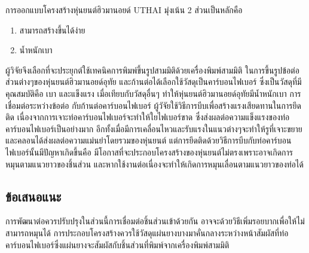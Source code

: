 การออกแบบโครงสร้างหุ่นยนต์ฮิวมานอยด์ UTHAI มุ่งเน้น 2 ส่วนเป็นหลักคือ
\vspace{-3mm}
\begin{enumerate}[label=\arabic*, leftmargin=1.5cm]
	\setlength\itemsep{-0.25em}
	\item สามารถสร้างขึ้นได้ง่าย
	\item น้ำหนักเบา
\end{enumerate}

ผู้วิจัยจึงเลือกที่จะประยุกต์ใช้เทคนิคการพิมพ์ขึ้นรูปสามมิติด้วยเครื่องพิมพ์สามมิติ ในการขึ้นรูปข้อต่อส่วนต่างๆของหุ่นยนต์ฮิวมานอยด์อุทัย
และก้านต่อได้เลือกใช้วัสดุเป็นคาร์บอนไฟเบอร์ ซึ่งเป็นวัสดุที่มีคุณสมบัติคือ เบา และแข็งแรง เมื่อเทียบกับวัสดุอื่นๆ ทำให้หุ่นยนต์ฮิวมานอยด์อุทัยมีน้ำหนักเบา
การเชื่อมต่อระหว่างข้อต่อ กับก้านต่อคาร์บอนไฟเบอร์ ผู้วัจัยใช้วิธีการบีบเพื่อสร้างแรงเสียดทานในการยึดติด
เนื่องจากการเจาะท่อคาร์บอนไฟเบอร์จะทำให้ใยไฟเบอร์ขาด ซึ่งส่งผลต่อความแข็งแรงของท่อคาร์บอนไฟเบอร์เป็นอย่างมาก
อีกทั้งเมื่อมีการเคลื่อนไหวและรับแรงในแนวต่างๆจะทำให้รูที่เจาะขยายและคลอนได้ส่งผลต่อความแม่นยำโดยรวมของหุ่นยนต์
แต่การยึดติดด้วยวิธีการบีบกับท่อคาร์บอนไฟเบอร์นั้นมีปัญหาเกิดขึ้นคือ มีโอกาสที่จะประกอบโครงสร้างของหุ่นยนต์ไม่ตรงเพราะอาจเกิดการหมุนตามแนวยาวของชิ้นส่วน
และหากใช้งานต่อเนื่องจะทำให้เกิดการหมุนเลื่อนตามแนวยาวของท่อได้

\subsection*{ข้อเสนอแนะ}
การพัฒนาต่อควรปรับปรุงในส่วนนี้การเชื่อมต่อชิ้นส่วนเข้าด้วยกัน อาจจะด้วยวิธีเพิ่มรอยบากเพื่อให้ไม่สามารถหมุนได้
การประกอบโครงสร้างควรใช้วัสดุแผ่นยางบางมาคั่นกลางระหว่างหน้าสัมผัสที่ท่อคาร์บอนไฟเบอร์ซึ่งแผ่นยางจะสัมผัสกับชิ้นส่วนที่พิมพ์จากเครื่องพิมพ์สามมิติ
